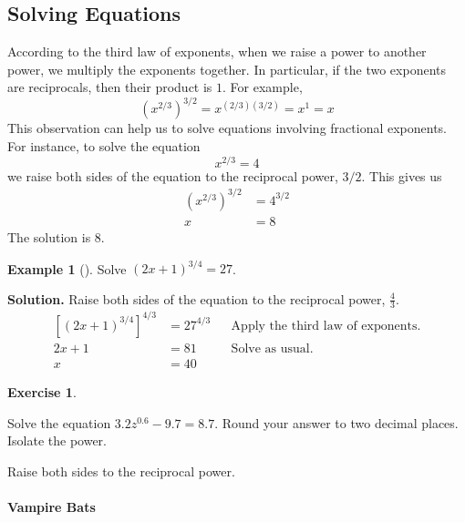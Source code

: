 \documentclass[10pt,]{book}
\theoremstyle{plain}
\theoremstyle{definition}
\theoremstyle{definition}
\theoremstyle{definition}
\newtheorem{example}[theorem]{Example}
\theoremstyle{definition}
\theoremstyle{definition}
\newtheorem{exercise}[theorem]{Exercise}
\numberwithin{equation}{section}
\newcommand{\amp}{ & }
\begin{document}
\subsection[Solving Equations]{Solving Equations}\label{subsection-80}

    According to the third law of exponents, when we raise a power to another power, we multiply the exponents together. In particular, if the two exponents are reciprocals, then their product is \(1\). For example,
    \begin{equation*}\left(x^{2/3}\right)^{3/2} = x^{(2/3) (3/2)} = x^1 = x\end{equation*}
    This observation can help us to solve equations involving fractional exponents. For instance, to solve the equation
    \begin{equation*}x^{2/3} = 4\end{equation*}
    we raise both sides of the equation to the reciprocal power, \(3/2\). This gives us
    \begin{align*}
    \left(x^{2/3}\right)^{3/2} \amp = 4^{3/2} \\
    x \amp = 8
    \end{align*}
    The solution is \(8\).
%
\begin{example}[]\label{example-equation-with-rational-exponents}
Solve \((2x + 1)^{3/4} = 27\).%
\par\medskip\noindent%
\textbf{Solution.}\quad 
    Raise both sides of the equation to the reciprocal power, \(\frac{4}{3}\).
    \begin{align*}
    \left[(2x + 1)^{3/4}\right]^{4/3} \amp= 27^{4/3} 
    \amp\amp  \text{Apply the third law of exponents.} \\
    2x + 1 \amp = 81 \amp\amp \text{Solve as usual.} \\
    x \amp = 40
    \end{align*}
%
\end{example}
\begin{exercise}\label{exercise-equation-with-rational-exponent}

        Solve the equation \(3.2z^{0.6} − 9.7 = 8.7\). Round your answer to two decimal places.
Isolate the power.%
\par
Raise both sides to the reciprocal power.%
\end{exercise}

\typeout{************************************************}
\typeout{************************************************}
\paragraph[Vampire Bats]{Vampire Bats}\label{paragraphs-53}
\end{document}
